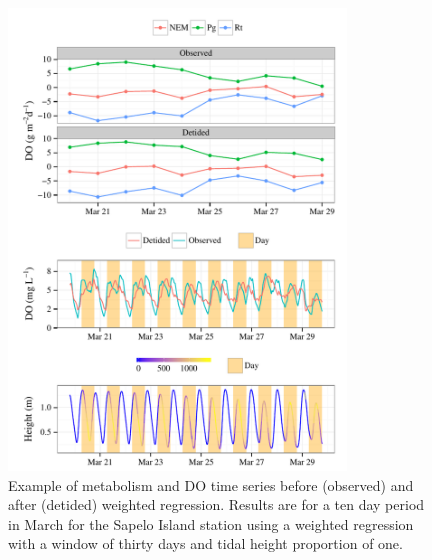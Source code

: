 \documentclass[letterpaper,12pt,oneside]{article}\usepackage[]{graphicx}\usepackage[]{color}
\newenvironment{knitrout}{}{} %
\begin{document}
\centering\vspace*{\fill}
\begin{knitrout}
\color{fgcolor}\begin{figure}[!ht]


{\centering \includegraphics[width=0.8\textwidth]{figure/case_ex1} 

}

\caption[Example of metabolism and \ac{DO} time series before (observed) and after (detided) weighted regression]{Example of metabolism and \ac{DO} time series before (observed) and after (detided) weighted regression. Results are for a ten day period in March for the Sapelo Island station using a weighted regression with a window of thirty days and tidal height proportion of one.\label{fig:case_ex1}}
\end{figure}


\end{knitrout}
\vfill
\clearpage

\centering\vspace*{\fill}

\vfill
\clearpage
\end{document}
